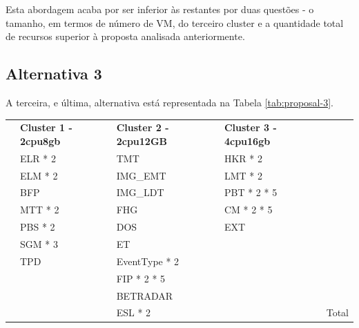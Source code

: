 Esta abordagem acaba por ser inferior às restantes por duas questões - o tamanho, em termos de número 
de \ac{VM}, do terceiro \gls{cluster} e a quantidade total de recursos superior à proposta
analisada anteriormente.

\subsection{Alternativa 3}

A terceira, e última, alternativa está representada na Tabela \ref{tab:proposal-3}.

\begin{table}[h!]
  \centering
  \begin{tabular}{|l|l|l|l|l|}
    \hline
    \rowcolor[HTML]{FBE6A3} 
    \multicolumn{5}{|c|}{\textbf{Alternativa 3}} \\ \hline
    \rowcolor[HTML]{4EAC5B} 
    \cellcolor{white} & \textbf{Cluster 1 - 2cpu8gb} & \textbf{Cluster 2 - 2cpu12GB} & \textbf{Cluster 3 - 4cpu16gb} & \cellcolor{white} \\ \hline
    \cellcolor{white} & \cellcolor[HTML]{A9D08E} ELR * 2 & \cellcolor[HTML]{BDD7EE} TMT  & \cellcolor[HTML]{A9D08E} HKR * 2 & \cellcolor{white} \\ \hline
    \cellcolor{white} & \cellcolor[HTML]{A9D08E} ELM * 2 & \cellcolor[HTML]{BDD7EE} IMG\_EMT  & \cellcolor[HTML]{A9D08E} LMT * 2 & \cellcolor{white} \\ \hline
    \cellcolor{white} & \cellcolor[HTML]{A9D08E} BFP & \cellcolor[HTML]{BDD7EE} IMG\_LDT  & \cellcolor[HTML]{A9D08E} PBT * 2 * 5 & \cellcolor{white} \\ \hline
    \cellcolor{white} & \cellcolor[HTML]{BDD7EE} MTT * 2 & \cellcolor[HTML]{BDD7EE} FHG  & \cellcolor[HTML]{BDD7EE} CM * 2 * 5 & \cellcolor{white} \\ \hline
    \cellcolor{white} & \cellcolor[HTML]{BDD7EE} PBS * 2 & \cellcolor[HTML]{BDD7EE} DOS & \cellcolor[HTML]{BDD7EE} EXT  & \cellcolor{white} \\ \hline
    \cellcolor{white} & \cellcolor[HTML]{BDD7EE} SGM * 3 & \cellcolor[HTML]{BDD7EE} ET  & \cellcolor{white} & \cellcolor{white} \\ \hline
    \cellcolor{white} & \cellcolor[HTML]{BDD7EE} TPD & \cellcolor[HTML]{A9D08E} EventType * 2  & \cellcolor{white} & \cellcolor{white} \\ \hline
    \cellcolor{white} & \cellcolor{white} & \cellcolor[HTML]{A9D08E} FIP * 2 * 5 & \cellcolor{white} & \cellcolor{white} \\ \hline
    \cellcolor{white} & \cellcolor{white} & \cellcolor[HTML]{A9D08E} BETRADAR & \cellcolor{white} & \cellcolor{white} \\ \hline
    \cellcolor{white} & \cellcolor{white} & \cellcolor[HTML]{A9D08E} ESL * 2 & \cellcolor{white} & Total \cellcolor{white} \\ \hline


\end{tabular}
\end{table}
